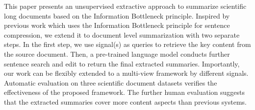 This paper presents an unsupervised extractive approach to summarize scientific long documents based on the Information Bottleneck principle. Inspired by previous work which uses the Information Bottleneck principle for sentence compression, we extend it to document level summarization with two separate steps. In the first step, we use signal(s) as queries to retrieve the key content from the source document. Then, a pre-trained language model conducts further sentence search and edit to return the final extracted summaries. Importantly, our work can be flexibly extended to a multi-view framework by different signals. Automatic evaluation on three scientific document datasets verifies the effectiveness of the proposed framework. The further human evaluation suggests that the extracted summaries cover more content aspects than previous systems.
